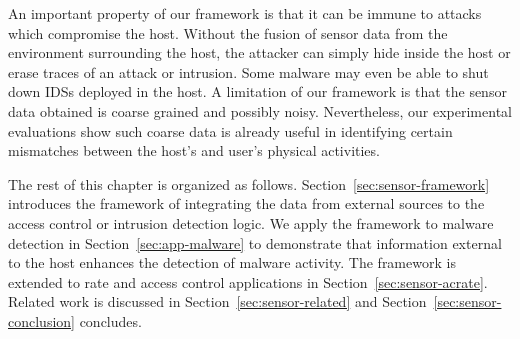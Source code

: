 An important property of our framework is that it can be immune
to attacks which compromise the host.
Without the fusion of sensor data from the environment surrounding the host, 
the attacker can simply hide inside the host or erase traces of an
attack or intrusion. Some malware may even be able
to shut down IDSs deployed in the host. A limitation of our
framework is that the sensor data obtained is coarse grained and
possibly noisy. Nevertheless, our experimental evaluations show 
such coarse data is already useful in identifying certain 
mismatches between the host's and user's physical activities.

The rest of this chapter is organized as follows.
Section~\ref{sec:sensor-framework} introduces the framework of integrating the data
from external sources to the access control or intrusion detection
logic.
We apply the framework to malware detection in
Section~\ref{sec:app-malware} to demonstrate that information
external to the host enhances the detection of malware activity.
The framework is extended to rate and access control applications in
Section~\ref{sec:sensor-acrate}.
Related work is discussed in Section~\ref{sec:sensor-related}
and Section~\ref{sec:sensor-conclusion} concludes.
